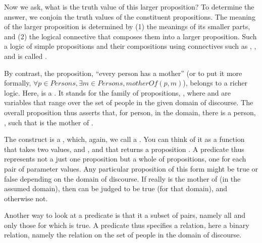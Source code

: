 \documentclass[letterpaper,10pt,english]{sphinxmanual}
\begin{document}
Now we ask, what is the truth value of this larger proposition? To
determine the answer, we conjoin the truth values of the constituent
propositions.  The meaning of the larger proposition is determined by
(1) the meanings of its smaller parts, and (2) the logical connective
that composes them into a larger proposition. Such a logic of simple
propositions and their compositions using connectives such as ,
, and  is called .

By contrast, the proposition, “every person has a mother” (or to put
it more formally, \(\forall p \in Persons, \exists m \in Persons,
motherOf(p,m)\)), belongs to a richer logic.  Here,  is
a . It stands for the family of propositions,
, where  and  are variables that range
over the set of people in the given domain of discourse.  The overall
proposition thus asserts that, for  person,  in the domain,
there is a person, , such that  is the mother of .

The  construct is a , which,
again, we call a . You can think of it as a function that
takes two values,  and , and that returns a proposition . A predicate thus represents not a just one
proposition but a whole  of propositions, one for each pair of
parameter values. Any particular proposition of this form might be
true or false depending on the domain of discourse. If  really is
the mother of  (in the assumed domain), then  can be
judged to be true (for that domain), and otherwise not.

Another way to look at a predicate is that it  a subset of
 pairs, namely all and only those for which  is
true. A predicate thus specifies a relation, here a binary relation,
namely the  relation on the set of people in the domain of
discourse.
\end{document}
